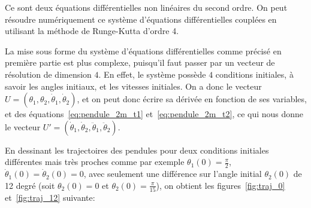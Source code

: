 Ce sont deux équations différentielles non linéaires du second ordre. 
On peut résoudre numériquement ce système d'équations différentielles couplées en utilisant la méthode de Runge-Kutta d'ordre 4.

La mise sous forme du système d'équations différentielles comme précisé en première partie est plus complexe,
puisqu'il faut passer par un vecteur de résolution de dimension $4$.
En effet, le système possède $4$ conditions initiales, à savoir les angles initiaux, et les vitesses initiales.
On a donc le vecteur $ U = (\theta_1, \theta_2, \dot \theta_1, \dot \theta_2) $, et on peut donc écrire sa dérivée en fonction de ses variables, et des équations~\ref{eq:pendule_2m_t1} et~\ref{eq:pendule_2m_t2},
ce qui nous donne le vecteur $ U' = (\dot \theta_1, \dot \theta_2, \ddot \theta_1, \ddot \theta_2) $.


\bigskip

En dessinant les trajectoires des pendules pour deux conditions initiales différentes mais très proches comme par exemple 
$ \theta_1(0) = \frac{\pi}{2} $, $ \dot \theta_1(0) = \dot \theta_2(0) = 0 $, avec seulement une différence sur l'angle initial $ \theta_2(0) $ de 12 degré (soit $ \theta_2(0) = 0 $ et $ \theta_2(0) = \frac{\pi}{15} $),
on obtient les figures~\ref{fig:traj_0} et~\ref{fig:traj_12} suivante:

